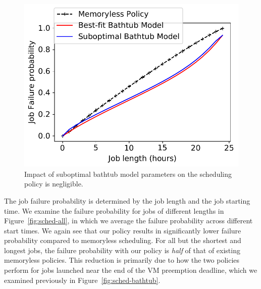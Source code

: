 \begin{figure}
\begin{minipage}[c]{0.3\linewidth}
    \includegraphics[width=\linewidth]{../graphs/wrong-model.pdf}
    \vspace*{-0.8cm}
  \caption{Impact of suboptimal bathtub model parameters on the scheduling policy is negligible.}
  \label{fig:wrong-model}
\end{minipage}
\vspace*{-0.4cm}
\end{figure}



The job failure probability is determined by the job length and the job starting time.
We examine the failure probability for jobs of different lengths in Figure~\ref{fig:sched-all}, in which we average the failure probability across different start times.
We again see that our policy results in significantly lower failure probability compared to memoryless scheduling.
For all but the shortest and longest jobs, the failure probability with our policy is \emph{half} of that of existing memoryless policies.
This reduction is primarily due to how the two policies perform for jobs launched near the end of the VM preemption deadline, which we examined previously in Figure~\ref{fig:sched-bathtub}. 


